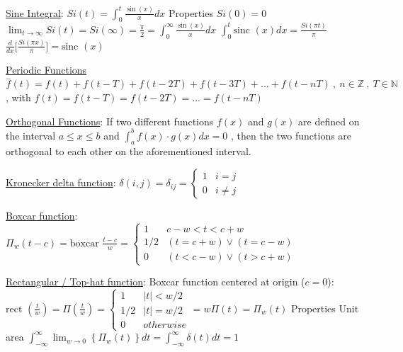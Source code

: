 \documentclass[12pt]{article}
\def\sinc{\text{sinc\ }} %
\def\boxcar{\text{boxcar\ }} %
\def\rect{\text{rect\ }} %
\begin{document}
\begin{flushleft}
	\uline{Sine Integral}: $\displaystyle Si(t) = \int_0^t \frac{\sin (x)}{x} dx $ \linebreak 
	Properties \linebreak 
	\textbullet \quad $Si(0) = 0$ \linebreak 
	\textbullet \quad $\lim_{t\to \infty} Si(t) = Si(\infty) = \frac{\pi}{2} = \int_0^{\infty} \frac{\sin (x)}{x} dx$ \linebreak 
	\textbullet \quad $\int_0^t \sinc (x) dx = \frac{Si(\pi t)}{\pi} $ \linebreak 
	\textbullet \quad $ \frac{d}{dx} \big[ \frac{Si(\pi x)}{\pi} \big] = \sinc (x) $ \linebreak 
	
	\uline{Periodic Functions} \linebreak 
	$\displaystyle \overset{-}{f}(t) = f(t) + f(t-T) + f(t-2T) + f(t-3T) + \ldots + f(t-nT) \ , \ n\in \mathbb{Z} \ , \ T \in \mathbb{N} $ , with $f(t) = f(t-T) = f(t-2T) = \ldots = f(t-nT)$ \linebreak 
	
	\uline{Orthogonal Functions}: If two different functions $f(x)$ and $g(x)$ are defined on the interval $a\leq x \leq b$ and $\displaystyle \int_a^b f(x) \cdot g(x) dx = 0 $ , then the two functions are orthogonal to each other on the aforementioned interval. \linebreak 
	
	\uline{Kronecker delta function}: $\displaystyle \delta (i,j) = \delta_{ij} = \begin{cases} 1 & i = j \\ 0 & i\neq j \end{cases} $ \linebreak 
	
	\uline{Boxcar function}: $\displaystyle \Pi_w (t-c) = \boxcar \frac{t-c}{w} = \begin{cases} 1 & c-w < t < c+w \\ 1/2 & (t=c+w) \lor (t=c-w) \\ 0 & (t<c-w) \lor (t>c+w) \end{cases} $ 
	\linebreak 
	
	\uline{Rectangular / Top-hat function}: Boxcar function centered at origin ($c=0$): 
	$\displaystyle \rect (\frac{t}{w}) = \Pi ( \frac{t}{w} ) = \begin{cases} 1 & |t| < w/2 \\ 1/2 & |t| = w/2 \\ 0 & otherwise \end{cases} = w\Pi (t) = \Pi_w (t)$ 
	\linebreak 
	Properties \linebreak 
	\textbullet \quad Unit area \linebreak 
	\textbullet \quad $\displaystyle \int_{-\infty}^{\infty} \lim_{w\to 0} \left\{ \Pi_w (t) \right\} dt = \int_{-\infty}^{\infty} \delta (t) dt = 1 $ \linebreak 
	

\end{flushleft}
\end{document}
